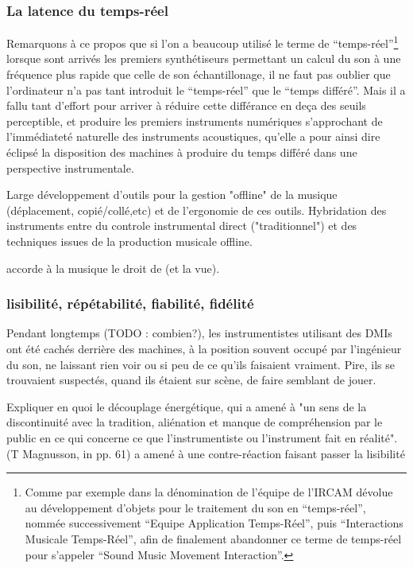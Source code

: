 \subsubsection{La latence du temps-réel}

Remarquons à ce propos que si l'on a beaucoup utilisé le terme de ``temps-réel''\footnote{Comme par exemple dans la dénomination de l'équipe de l'IRCAM dévolue au développement d'objets pour le traitement du son en ``temps-réel'', nommée successivement ``Equipe Application Temps-Réel'', puis ``Interactions Musicale Temps-Réel'', afin de finalement abandonner ce terme de temps-réel pour s'appeler ``Sound Music Movement Interaction''.} lorsque sont arrivés les premiers synthétiseurs permettant un calcul du son à une fréquence plus rapide que celle de son échantillonage, il ne faut pas oublier que l'ordinateur n'a pas tant introduit le ``temps-réel'' que le ``temps différé''.
Mais il a fallu tant d'effort pour arriver à réduire cette différance en deça des seuils perceptible, et produire les premiers instruments numériques s'approchant de l'immédiateté naturelle des instruments acoustiques, qu'elle a pour ainsi dire éclipsé la disposition des machines à produire du temps différé dans une perspective instrumentale.


Large développement d'outils pour la gestion "offline" de la musique (déplacement, copié/collé,etc) et de l'ergonomie de ces outils.
Hybridation des instruments entre du controle instrumental direct ("traditionnel") et des techniques issues de la production musicale offline.


accorde à la musique le droit de  (et la vue).

\subsubsection{lisibilité, répétabilité, fiabilité, fidélité}

Pendant longtemps (TODO : combien?), les instrumentistes utilisant des \glspl{DMI} ont été cachés derrière des machines, à la position souvent occupé par l'ingénieur du son, ne laissant rien voir ou si peu de ce qu'ils faisaient vraiment. Pire, ils se trouvaient suspectés, quand ils étaient sur scène, de faire semblant de jouer. \cite{cascone_aesthetics_2000}


Expliquer en quoi le découplage énergétique, qui a amené à "un sens de la discontinuité avec la tradition, aliénation et manque de compréhension par le public en ce qui concerne ce que l'instrumentiste ou l'instrument fait en réalité". (T Magnusson, in \cite{magnusson_sonic_2019} pp. 61) a amené à une contre-réaction faisant passer la lisibilité 


